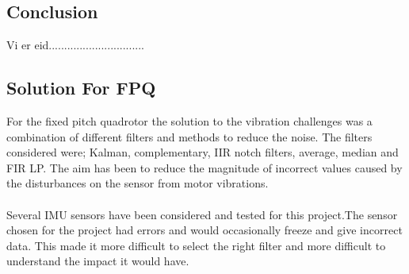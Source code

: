 \subsection{Conclusion}

Vi er eid...............................


\subsection{Solution For FPQ}
For the fixed pitch quadrotor the solution to the vibration challenges was a combination of different filters and methods to reduce the noise. The filters considered were; Kalman, complementary, IIR notch filters, average, median and FIR LP. The aim has been to reduce the magnitude of incorrect values caused by the disturbances on the sensor from motor vibrations. \\
\\
Several IMU sensors have been considered and tested for this project.The sensor chosen for the project had errors and would occasionally freeze and give incorrect data. This made it more difficult to select the right filter and more difficult to understand the impact it would have. 


